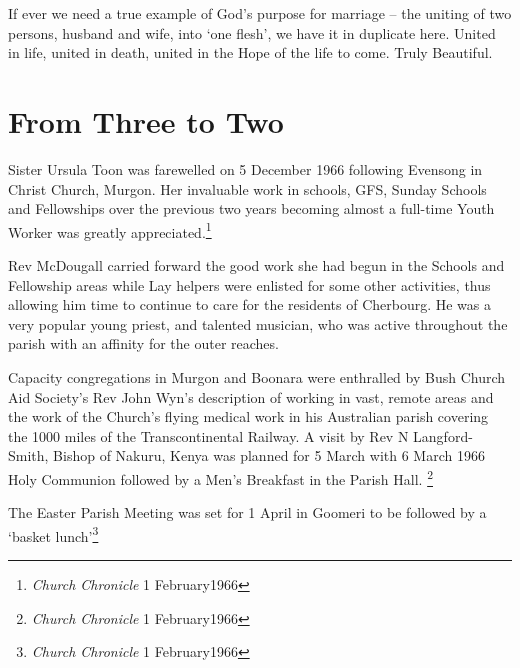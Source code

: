If ever we need a true example of God's purpose for marriage -- the uniting of two persons, husband and wife, into `one flesh', we have it in duplicate here. United in life, united in death, united in the Hope of the life to come. Truly Beautiful.





\section{From Three to Two}



Sister Ursula Toon was farewelled on 5 December 1966 following Evensong in Christ Church, Murgon. Her invaluable work in schools, GFS, Sunday Schools and Fellowships over the previous two years becoming almost a full-time Youth Worker was greatly appreciated.\footnote{\emph{Church Chronicle} 1 February1966}


Rev McDougall carried forward the good work she had begun in the Schools and Fellowship areas while Lay helpers were enlisted for some other activities, thus allowing him time to continue to care for the residents of Cherbourg. He was a very popular young priest, and talented musician, who was active throughout the parish with an affinity for the outer reaches.



Capacity congregations in Murgon and Boonara were enthralled by Bush Church Aid Society's Rev John Wyn's description of working in vast, remote areas and the work of the Church's flying medical work in his Australian parish covering the 1000 miles of the Transcontinental Railway. A visit by Rev N Langford-Smith, Bishop of Nakuru, Kenya was planned for 5 March with 6 March 1966 Holy Communion followed by a Men's Breakfast in the Parish Hall. \footnote{\emph{Church Chronicle} 1 February1966}


The Easter Parish Meeting was set for 1 April in Goomeri to be followed by a `basket lunch'\footnote{\emph{Church Chronicle} 1 February1966}



